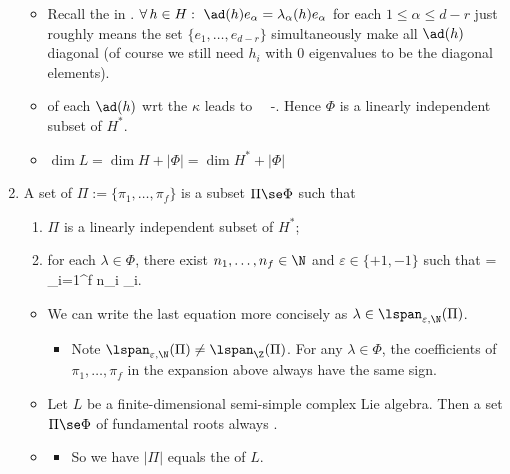 \documentclass{article}
\begin{document}
\begin{enumerate}
\begin{itemize}
 \item { Recall the  in \cite{horn2012matrix}.  $\forall \, h\in H : \ \ad(h)e_\alpha = \lambda_\alpha(h) e_\alpha$ for each $1\leq\alpha\leq d-r$ just roughly means the set $\{e_1,\ldots,e_{d-r}\}$ simultaneously make all $\ad(h)$ diagonal (of course we still need $h_i$ with $0$ eigenvalues to be the diagonal elements).}
\item {} of each $\ad(h)$ \gls{wrt} the  $\kappa$ leads to
\bse
\lambda \in \Phi\ \Rightarrow\ -\lambda\in \Phi.
\ese
Hence $\Phi$ is  a linearly independent subset of $H^*$.

\item $\dim L  = \dim H + |\Phi|=\dim H^* + |\Phi|$ 
\end{itemize}

\item {}
A set of  $\Pi:=\{\pi_1,\ldots,\pi_f\}$ is a subset $\Pi\se\Phi$ such that 
\begin{enumerate}
\item $\Pi$ is a linearly independent subset of $H^*$;
\item for each $\lambda \in \Phi$, there exist $n_1,\ldots,n_f\in \N$ and $\varepsilon \in \{+1,-1\}$ such that
\bse
\lambda = \varepsilon \, \sum_{i=1}^f n_i \pi_i.
\ese
\end{enumerate}
\begin{itemize}
    \item {} We can write the last equation more concisely as $\lambda \in \lspan_{\varepsilon,\N}(\Pi)$. 
    \begin{itemize}[$\ast$]
        \item Note $\lspan_{\varepsilon,\N}(\Pi)\neq \lspan_{\Z}(\Pi)$.  For any $\lambda\in \Phi$, the coefficients of $\pi_1,\ldots,\pi_f$ in the expansion above always have the same sign. 
    \end{itemize}
    \item {} Let $L$ be a finite-dimensional semi-simple complex Lie algebra. Then a set $\Pi\se\Phi$ of fundamental roots always .
\item {}
\begin{itemize}[$\ast$]
    \item So we have $|\Pi|$ equals the  of $L$.
\end{itemize}
\end{itemize}


\end{enumerate}
\end{document}
